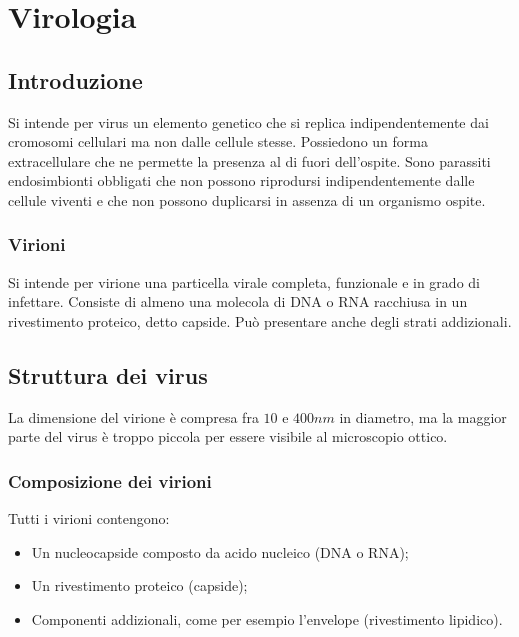 \chapter{Virologia}

\section{Introduzione}
Si intende per virus un elemento genetico che si replica indipendentemente dai cromosomi cellulari ma non dalle cellule stesse.
Possiedono un forma extracellulare che ne permette la presenza al di fuori dell'ospite.
Sono parassiti endosimbionti obbligati che non possono riprodursi indipendentemente dalle cellule viventi e che non possono duplicarsi in assenza di un organismo ospite.

	\subsection{Virioni}
	Si intende per virione una particella virale completa, funzionale e in grado di infettare. 
	Consiste di almeno una molecola di DNA o RNA racchiusa in un rivestimento proteico, detto capside. 
	Pu\`o presentare anche degli strati addizionali. 

\section{Struttura dei virus}
La dimensione del virione \`e compresa fra $10$ e $400\si{nm}$ in diametro, ma la maggior parte del virus \`e troppo piccola per essere visibile al microscopio ottico.

	\subsection{Composizione dei virioni}
	Tutti i virioni contengono:
	\begin{multicols}{2}
		\begin{itemize}
    			\item Un nucleocapside composto da acido nucleico (DNA o RNA);
    			\item Un rivestimento proteico (capside);
    			\item Componenti addizionali, come per esempio l'envelope (rivestimento lipidico).
		\end{itemize}
	\end{multicols}	

